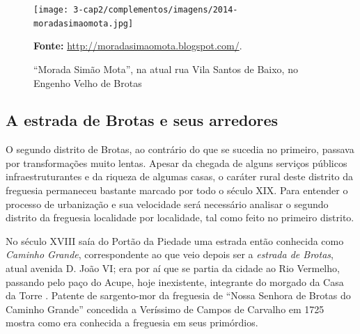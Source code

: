 \begin{figure}
\caption{``Morada Simão Mota'', na atual rua Vila Santos de Baixo, no Engenho Velho de Brotas}
\centering
\texttt{[image: 3-cap2/complementos/imagens/2014-moradasimaomota.jpg]}{\footnotesize \par \textbf{Fonte:} \url{http://moradasimaomota.blogspot.com/}. } 
\label{fig:2014-moradasimaomota}
\end{figure}

\subsection{A estrada de Brotas e seus arredores}\label{subsec:estrabrotas}

O segundo distrito de Brotas, ao contrário do que se sucedia no primeiro, passava por transformações muito lentas. Apesar da chegada de alguns serviços públicos infraestruturantes e da riqueza de algumas casas, o caráter rural deste distrito da freguesia permaneceu bastante marcado por todo o século XIX. Para entender o processo de urbanização e sua velocidade será necessário analisar o segundo distrito da freguesia localidade por localidade, tal como feito no primeiro distrito.

No século XVIII saía do Portão da Piedade uma estrada então conhecida como \textit{Caminho Grande}, correspondente ao que veio depois ser a \textit{estrada de Brotas}, atual avenida D. João VI; era por aí que se partia da cidade ao Rio Vermelho, passando pelo paço do Acupe, hoje inexistente, integrante do morgado da Casa da Torre \cite[p.~85]{campos_brotas_1942}. Patente de sargento-mor da freguesia de ``Nossa Senhora de Brotas do Caminho Grande'' concedida a Veríssimo de Campos de Carvalho em 1725 \cite[p.~114]{texmel_manusbn_1896} mostra como era conhecida a freguesia em seus primórdios.

